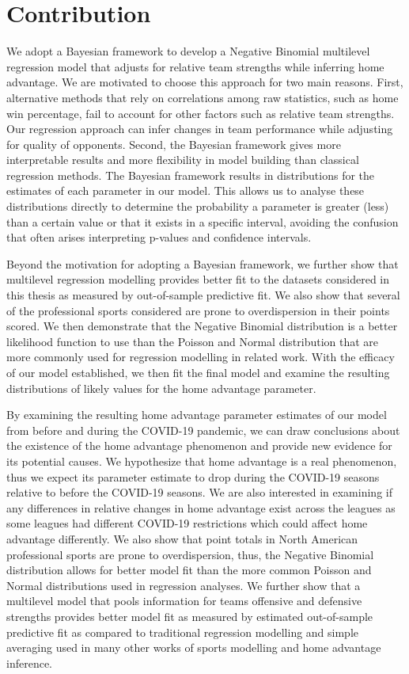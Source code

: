 \section{Contribution}

We adopt a Bayesian framework to develop a Negative Binomial multilevel regression model that adjusts for relative team strengths while inferring home advantage. We are motivated to choose this approach for two main reasons. First, alternative methods that rely on correlations among raw statistics, such as home win percentage, fail to account for other factors such as relative team strengths. Our regression approach can infer changes in team performance while adjusting for quality of opponents. Second, the Bayesian framework gives more interpretable results and more flexibility in model building than classical regression methods. The Bayesian framework results in distributions for the estimates of each parameter in our model. This allows us to analyse these distributions directly to determine the probability a parameter is greater (less) than a certain value or that it exists in a specific interval, avoiding the confusion that often arises interpreting p-values and confidence intervals.

Beyond the motivation for adopting a Bayesian framework, we further show that multilevel regression modelling provides better fit to the datasets considered in this thesis as measured by out-of-sample predictive fit. We also show that several of the professional sports considered are prone to overdispersion in their points scored. We then demonstrate that the Negative Binomial distribution is a better likelihood function to use than the Poisson and Normal distribution that are more commonly used for regression modelling in related work. With the efficacy of our model established, we then fit the final model and examine the resulting distributions of likely values for the home advantage parameter.

By examining the resulting home advantage parameter estimates of our model from before and during the COVID-19 pandemic, we can draw conclusions about the existence of the home advantage phenomenon and provide new evidence for its potential causes. We hypothesize that home advantage is a real phenomenon, thus we expect its parameter estimate to drop during the COVID-19 seasons relative to before the COVID-19 seasons. We are also interested in examining if any differences in relative changes in home advantage exist across the leagues as some leagues had different COVID-19 restrictions which could affect home advantage differently. We also show that point totals in North American professional sports are prone to overdispersion, thus, the Negative Binomial distribution allows for better model fit than the more common Poisson and Normal distributions used in regression analyses. We further show that a multilevel model that pools information for teams offensive and defensive strengths provides better model fit as measured by estimated out-of-sample predictive fit as compared to traditional regression modelling and simple averaging used in many other works of sports modelling and home advantage inference.

